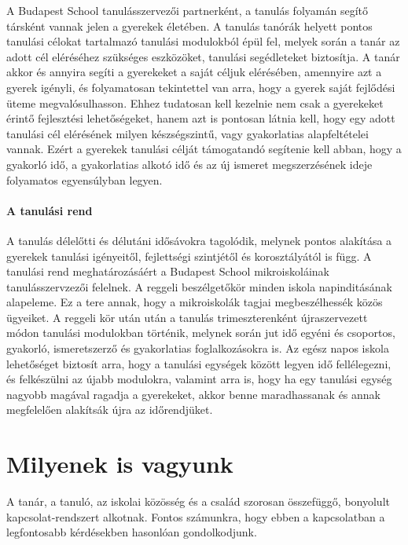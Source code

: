 A Budapest School tanulásszervezői partnerként, a tanulás folyamán
segítő társként vannak jelen a gyerekek életében. A tanulás tanórák
helyett pontos tanulási célokat tartalmazó tanulási modulokból épül fel,
melyek során a tanár az adott cél eléréséhez szükséges eszközöket,
tanulási segédleteket biztosítja. A tanár akkor és annyira segíti a
gyerekeket a saját céljuk elérésében, amennyire azt a gyerek igényli, és
folyamatosan tekintettel van arra, hogy a gyerek saját fejlődési üteme
megvalósulhasson. Ehhez tudatosan kell kezelnie nem csak a gyerekeket
érintő fejlesztési lehetőségeket, hanem azt is pontosan látnia kell,
hogy egy adott tanulási cél elérésének milyen készségszintű, vagy
gyakorlatias alapfeltételei vannak. Ezért a gyerekek tanulási célját
támogatandó segítenie kell abban, hogy a gyakorló idő, a gyakorlatias
alkotó idő és az új ismeret megszerzésének ideje folyamatos egyensúlyban
legyen.

\paragraph{A tanulási rend}

A tanulás délelőtti és délutáni idősávokra tagolódik, melynek pontos
alakítása a gyerekek tanulási igényeitől, fejlettségi szintjétől és
korosztályától is függ. A tanulási rend meghatározásáért a Budapest
School mikroiskoláinak tanulásszervzezői felelnek. A reggeli
beszélgetőkör minden iskola napinditásának alapeleme. Ez a tere annak,
hogy a mikroiskolák tagjai megbeszélhessék közös ügyeiket. A reggeli kör
után után a tanulás trimeszterenként újraszervezett módon tanulási
modulokban történik, melynek során jut idő egyéni és csoportos,
gyakorló, ismeretszerző és gyakorlatias foglalkozásokra is. Az egész
napos iskola lehetőséget biztosít arra, hogy a tanulási egységek között
legyen idő fellélegezni, és felkészülni az újabb modulokra, valamint
arra is, hogy ha egy tanulási egység nagyobb magával ragadja a
gyerekeket, akkor benne maradhassanak és annak megfelelően alakítsák
újra az időrendjüket.


\section{Milyenek is vagyunk}
\label{sec:milyenek_vagyunk}

A tanár, a tanuló, az iskolai közösség és a család szorosan összefüggő, bonyolult kapcsolat-rendszert alkotnak. Fontos számunkra, hogy ebben a kapcsolatban a legfontosabb kérdésekben hasonlóan gondolkodjunk.
